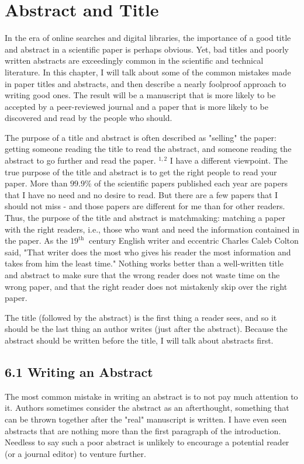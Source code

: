 \section*{Abstract and Title}
In the era of online searches and digital libraries, the importance of a good title and abstract in a scientific paper is perhaps obvious. Yet, bad titles and poorly written abstracts are exceedingly common in the scientific and technical literature. In this chapter, I will talk about some of the common mistakes made in paper titles and abstracts, and then describe a nearly foolproof approach to writing good ones. The result will be a manuscript that is more likely to be accepted by a peer-reviewed journal and a paper that is more likely to be discovered and read by the people who should.

The purpose of a title and abstract is often described as "selling" the paper: getting someone reading the title to read the abstract, and someone reading the abstract to go further and read the paper. ${ }^{1,2}$ I have a different viewpoint. The true purpose of the title and abstract is to get the right people to read your paper. More than $99.9 \%$ of the scientific papers published each year are papers that I have no need and no desire to read. But there are a few papers that I should not miss - and those papers are different for me than for other readers. Thus, the purpose of the title and abstract is matchmaking: matching a paper with the right readers, i.e., those who want and need the information contained in the paper. As the $19^{\text{th }}$ century English writer and eccentric Charles Caleb Colton said, "That writer does the most who gives his reader the most information and takes from him the least time." Nothing works better than a well-written title and abstract to make sure that the wrong reader does not waste time on the wrong paper, and that the right reader does not mistakenly skip over the right paper.

The title (followed by the abstract) is the first thing a reader sees, and so it should be the last thing an author writes (just after the abstract). Because the abstract should be written before the title, I will talk about abstracts first.

\subsection*{6.1 Writing an Abstract}
The most common mistake in writing an abstract is to not pay much attention to it. Authors sometimes consider the abstract as an afterthought, something that can be thrown together after the "real" manuscript is written. I have even seen abstracts that are nothing more than the first paragraph of the introduction. Needless to say such a poor abstract is unlikely to encourage a potential reader (or a journal editor) to venture further.


